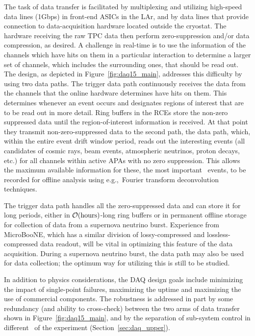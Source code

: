 The task of data transfer is facilitated by multiplexing and utilizing
high-speed data lines (1Gbps) in front-end ASICs in the LAr, and by
data lines that
provide connection to data-acquisition hardware located outside the
cryostat.  The hardware receiving the raw TPC data then perform
zero-suppression and/or data compression, as desired.  A challenge in
real-time is to use the information of the channels which have hits on
them in a particular interaction to determine a larger set of
channels, which includes the surrounding ones, that should be read
out.  The design, as depicted in Figure~\ref{fig:daq15_main},
addresses this difficulty by using two data paths.  The trigger data
path continuously receives the data from the channels that the online
hardware determines have hits on them.  This determines whenever an
event occurs and designates regions of interest that are to be read
out in more detail.  Ring buffers in the RCEs store the non-zero
suppressed data until the region-of-interest information is received.
At that point they transmit non-zero-suppressed data to the second
path, the data path, which, within the entire event drift window period, reads out the interesting events (all
candidates of cosmic rays, beam events, atmospheric neutrinos, proton
decays, etc.) for all channels within active APAs with no zero
suppression.  This allows
the maximum available information for these, the most important \LBNE\
events, to be recorded for offline analysis using e.g.,\ Fourier
transform deconvolution techniques.

The trigger data path handles all the zero-suppressed data and can
store it for long periods, either in ${\cal O}(\mathrm{hours})$-long
ring buffers or in permanent offline storage for collection of data
from a supernova neutrino burst.  Experience from MicroBooNE, which
has a similar division of lossy-compressed and lossless-compressed
data readout, will be vital in optimizing this feature of the data
acquisition.  During a supernova neutrino burst, the data path may
also be used for data collection; the optimum way for utilizing this
is still to be studied.

In addition to physics considerations, the DAQ design goals include
minimizing the impact of single-point failures, maximizing the uptime
and maximizing the use of commercial components.  The robustness is
addressed in part by some redundancy (and ability to cross-check)
between the two arms of data transfer shown in
Figure~\ref{fig:daq15_main}, and by the separation of sub-system
control in different \COMPARTMENTS\ of the experiment
(Section~\ref{sec:daq_upper}).

